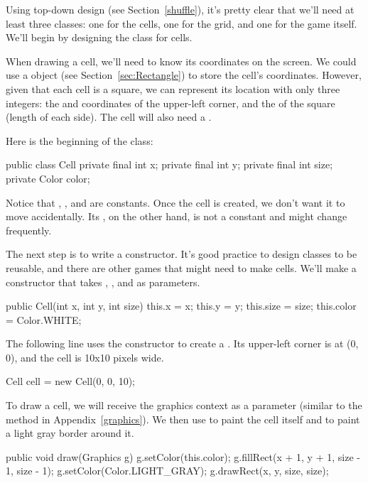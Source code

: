 Using top-down design (see Section~\ref{shuffle}), it's pretty clear that we'll need at least three classes: one for the cells, one for the grid, and one for the game itself.
We'll begin by designing the class for cells.

When drawing a cell, we'll need to know its coordinates on the screen.
We could use a  object (see Section~\ref{sec:Rectangle}) to store the cell's coordinates.
However, given that each cell is a square, we can represent its location with only three integers: the  and  coordinates of the upper-left corner, and the  of the square (length of each side).
The cell will also need a .

Here is the beginning of the  class:

\begin{code}
public class Cell {
    private final int x;
    private final int y;
    private final int size;
    private Color color;
}
\end{code}

Notice that , , and  are constants.
Once the cell is created, we don't want it to move accidentally.
Its , on the other hand, is not a constant and might change frequently.

The next step is to write a constructor.
It's good practice to design classes to be reusable, and there are other games that might need to make cells.
We'll make a constructor that takes , , and  as parameters.

\begin{code}
public Cell(int x, int y, int size) {
    this.x = x;
    this.y = y;
    this.size = size;
    this.color = Color.WHITE;
}
\end{code}

The following line uses the constructor to create a .
Its upper-left corner is at (0, 0), and the cell is 10x10 pixels wide.

\begin{code}
Cell cell = new Cell(0, 0, 10);
\end{code}

To draw a cell, we will receive the graphics context as a parameter (similar to the  method in Appendix~\ref{graphics}).
We then use  to paint the cell itself and  to paint a light gray border around it.

\begin{code}
public void draw(Graphics g) {
    g.setColor(this.color);
    g.fillRect(x + 1, y + 1, size - 1, size - 1);
    g.setColor(Color.LIGHT_GRAY);
    g.drawRect(x, y, size, size);
}
\end{code}

